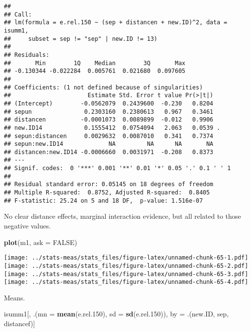 \documentclass[
]{article}
\newenvironment{Shaded}{\begin{snugshade}}{\end{snugshade}}
\newcommand{\AttributeTok}[1]{\textcolor[rgb]{0.13,0.29,0.53}{#1}}
\newcommand{\ConstantTok}[1]{\textcolor[rgb]{0.56,0.35,0.01}{#1}}
\newcommand{\FloatTok}[1]{\textcolor[rgb]{0.00,0.00,0.81}{#1}}
\newcommand{\FunctionTok}[1]{\textcolor[rgb]{0.13,0.29,0.53}{\textbf{#1}}}
\newcommand{\NormalTok}[1]{#1}
\newcommand{\OtherTok}[1]{\textcolor[rgb]{0.56,0.35,0.01}{#1}}
\begin{document}
\begin{verbatim}
## 
## Call:
## lm(formula = e.rel.150 ~ (sep + distancen + new.ID)^2, data = isumm1, 
##     subset = sep != "sep" | new.ID != 13)
## 
## Residuals:
##       Min        1Q    Median        3Q       Max 
## -0.130344 -0.022284  0.005761  0.021680  0.097605 
## 
## Coefficients: (1 not defined because of singularities)
##                      Estimate Std. Error t value Pr(>|t|)  
## (Intercept)        -0.0562079  0.2439600  -0.230   0.8204  
## sepun               0.2303160  0.2380613   0.967   0.3461  
## distancen          -0.0001073  0.0089899  -0.012   0.9906  
## new.ID14            0.1555412  0.0754094   2.063   0.0539 .
## sepun:distancen     0.0029632  0.0087010   0.341   0.7374  
## sepun:new.ID14             NA         NA      NA       NA  
## distancen:new.ID14 -0.0006660  0.0031971  -0.208   0.8373  
## ---
## Signif. codes:  0 '***' 0.001 '**' 0.01 '*' 0.05 '.' 0.1 ' ' 1
## 
## Residual standard error: 0.05145 on 18 degrees of freedom
## Multiple R-squared:  0.8752, Adjusted R-squared:  0.8405 
## F-statistic: 25.24 on 5 and 18 DF,  p-value: 1.516e-07
\end{verbatim}

No clear distance effects, marginal interaction evidence, but all
related to those negative values.

\begin{Shaded}
\begin{Highlighting}[]
\FunctionTok{plot}\NormalTok{(m1, }\AttributeTok{ask =} \ConstantTok{FALSE}\NormalTok{)}
\end{Highlighting}
\end{Shaded}

\texttt{[image: ../stats-meas/stats\_files/figure-latex/unnamed-chunk-65-1.pdf]}
\texttt{[image: ../stats-meas/stats\_files/figure-latex/unnamed-chunk-65-2.pdf]}
\texttt{[image: ../stats-meas/stats\_files/figure-latex/unnamed-chunk-65-3.pdf]}
\texttt{[image: ../stats-meas/stats\_files/figure-latex/unnamed-chunk-65-4.pdf]}

Means.

\begin{Shaded}
\begin{Highlighting}[]
\NormalTok{isumm1[, .(}\AttributeTok{mn =} \FunctionTok{mean}\NormalTok{(e.rel}\FloatTok{.150}\NormalTok{), }\AttributeTok{sd =} \FunctionTok{sd}\NormalTok{(e.rel}\FloatTok{.150}\NormalTok{)), by }\OtherTok{=}\NormalTok{ .(new.ID, sep, distancef)]}
\end{Highlighting}
\end{Shaded}
\end{document}
